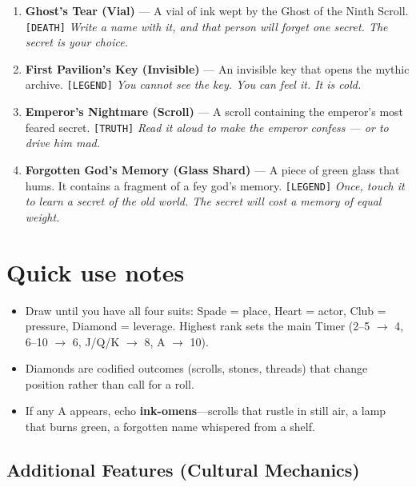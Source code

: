 \begin{enumerate}
\item[J] \textbf{Ghost's Tear (Vial)} --- A vial of ink wept by the Ghost of the Ninth Scroll. \texttt{[DEATH]}
  \hfill \textit{Write a name with it, and that person will forget one secret. The secret is your choice.}
\item[Q] \textbf{First Pavilion's Key (Invisible)} --- An invisible key that opens the mythic archive. \texttt{[LEGEND]}
  \hfill \textit{You cannot see the key. You can feel it. It is cold.}
\item[K] \textbf{Emperor's Nightmare (Scroll)} --- A scroll containing the emperor's most feared secret. \texttt{[TRUTH]}
  \hfill \textit{Read it aloud to make the emperor confess --- or to drive him mad.}
\item[A] \textbf{Forgotten God's Memory (Glass Shard)} --- A piece of green glass that hums. It contains a fragment of a fey god's memory. \texttt{[LEGEND]}
  \hfill \textit{Once, touch it to learn a secret of the old world. The secret will cost a memory of equal weight.}
\end{enumerate}

\section*{Quick use notes}
\label{sec:lethai-thora-quick-use}
\begin{itemize}
\item Draw until you have all four suits: Spade = place, Heart = actor, Club = pressure, Diamond = leverage. Highest rank sets the main Timer (2--5 \(\rightarrow\) 4, 6--10 \(\rightarrow\) 6, J/Q/K \(\rightarrow\) 8, A \(\rightarrow\) 10).
\item Diamonds are codified outcomes (scrolls, stones, threads) that change position rather than call for a roll.
\item If any A appears, echo \textbf{ink-omens}---scrolls that rustle in still air, a lamp that burns green, a forgotten name whispered from a shelf.
\end{itemize}

\subsection*{Additional Features (Cultural Mechanics)}
\label{sec:lethai-thora-mechanics}

